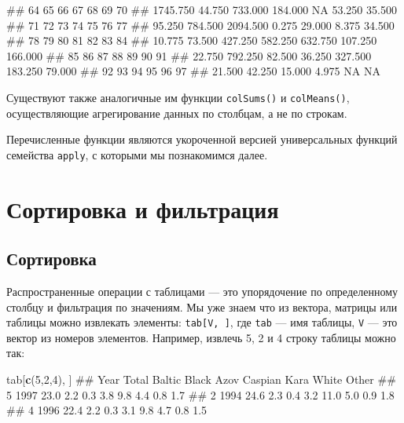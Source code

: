 \documentclass[]{book}
\newenvironment{Shaded}{\begin{snugshade}}{\end{snugshade}}
\newcommand{\KeywordTok}[1]{\textcolor[rgb]{0.13,0.29,0.53}{\textbf{#1}}}
\newcommand{\DecValTok}[1]{\textcolor[rgb]{0.00,0.00,0.81}{#1}}
\newcommand{\NormalTok}[1]{#1}
\begin{document}
\begin{Shaded}
\begin{Highlighting}[]
\NormalTok{##        64        65        66        67        68        69        70 }
\NormalTok{##  1745.750    44.750   733.000   184.000        NA    53.250    35.500 }
\NormalTok{##        71        72        73        74        75        76        77 }
\NormalTok{##    95.250   784.500  2094.500     0.275    29.000     8.375    34.500 }
\NormalTok{##        78        79        80        81        82        83        84 }
\NormalTok{##    10.775    73.500   427.250   582.250   632.750   107.250   166.000 }
\NormalTok{##        85        86        87        88        89        90        91 }
\NormalTok{##    22.750   792.250    82.500    36.250   327.500   183.250    79.000 }
\NormalTok{##        92        93        94        95        96        97 }
\NormalTok{##    21.500    42.250    15.000     4.975        NA        NA}
\end{Highlighting}
\end{Shaded}

Существуют также аналогичные им функции \texttt{colSums()} и
\texttt{colMeans()}, осуществляющие агрегирование данных по столбцам, а
не по строкам.

Перечисленные функции являются укороченной версией универсальных функций
семейства \texttt{apply}, с которыми мы познакомимся далее.

\section{Сортировка и фильтрация}\label{filtering_sorting}

\subsection{Сортировка}\label{table_sorting}

Распространенные операции с таблицами --- это упорядочение по
определенному столбцу и фильтрация по значениям. Мы уже знаем что из
вектора, матрицы или таблицы можно извлекать элементы:
\texttt{tab{[}V,\ {]}}, где \texttt{tab} --- имя таблицы, \texttt{V} ---
это вектор из номеров элементов. Например, извлечь 5, 2 и 4 строку
таблицы можно так:

\begin{Shaded}
\begin{Highlighting}[]
\NormalTok{tab[}\KeywordTok{c}\NormalTok{(}\DecValTok{5}\NormalTok{,}\DecValTok{2}\NormalTok{,}\DecValTok{4}\NormalTok{), ]}
\NormalTok{##   Year Total Baltic Black Azov Caspian Kara White Other}
\NormalTok{## 5 1997  23.0    2.2   0.3  3.8     9.8  4.4   0.8   1.7}
\NormalTok{## 2 1994  24.6    2.3   0.4  3.2    11.0  5.0   0.9   1.8}
\NormalTok{## 4 1996  22.4    2.2   0.3  3.1     9.8  4.7   0.8   1.5}
\end{Highlighting}
\end{Shaded}
\end{document}
